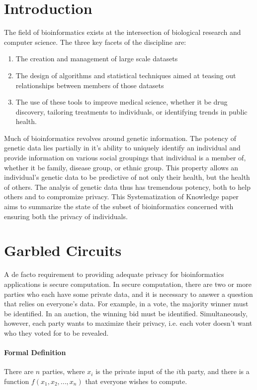 \section{Introduction}

The field of bioinformatics exists at the intersection of biological research and computer science. The three key facets of the discipline are:

\begin{enumerate}
\item The creation and management of large scale datasets
\item The design of algorithms and statistical techniques aimed at teasing out relationships between members of those datasets
\item The use of these tools to improve medical science, whether it be drug discovery, tailoring treatments to individuals, or identifying trends in public health.
\end{enumerate}

Much of bioinformatics revolves around genetic information. The potency of genetic data lies partially in it's ability to uniquely identify an individual and provide information on various social groupings that individual is a member of, whether it be family, disease group, or ethnic group. This property allows an individual's genetic data to be predictive of not only their health, but the health of others. The analyis of genetic data thus has tremendous potency, both to help others and to compromize privacy. This Systematization of Knowledge paper aims to summarize the state of the subset of bioinformatics concerned with ensuring both the privacy of individuals.

\section{Garbled Circuits}

A de facto requirement to providing adequate privacy for bioinformatics applications is secure computation. In secure computation, there are two or more parties who each have some private data, and it is necessary to answer a question that relies on everyone's data. For example, in a vote, the majority winner must be identified. In an auction, the winning bid must be identified. Simultaneously, however, each party wants to maximize their privacy, i.e. each voter doesn't want who they voted for to be revealed.

\paragraph{Formal Definition}
There are $n$ parties, where $x_i$ is the private input of the $i$th party, and there is a function $f(x_1, x_2, ..., x_n)$ that everyone wishes to compute. 

